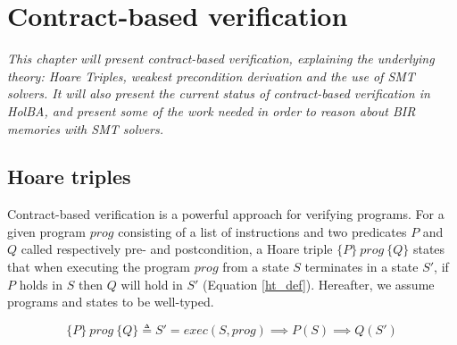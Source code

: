 \documentclass{kththesis}
\newcommand{\htriple}[3]{\ensuremath{\{#1\}~#2~\{#3\}}}
\begin{document}
{%
%

\chapter{Contract-based verification} \label{contract-based-verif}
\vspace{-1cm}
\textit{This chapter will present contract-based verification, explaining the underlying theory: Hoare Triples, weakest precondition derivation and the use of SMT solvers. It will also present the current status of contract-based verification in HolBA, and present some of the work needed in order to reason about BIR memories with SMT solvers.}

\section{Hoare triples} \label{hoare-triples}

Contract-based verification is a powerful approach for verifying programs. For a given program $prog$ consisting of a list of instructions and two predicates $P$ and $Q$ called respectively pre- and postcondition, a Hoare triple \htriple{P}{prog}{Q} states that when executing the program $prog$ from a state $S$ terminates in a state $S'$, if $P$ holds in $S$ then $Q$ will hold in $S'$ (Equation \ref{ht_def}). Hereafter, we assume programs and states to be well-typed.

\begin{equation}
  \htriple{P}{prog}{Q} \triangleq S' = exec(S, prog) \implies P(S) \implies Q(S')
  \label{ht_def}
\end{equation}

}
\end{document}
